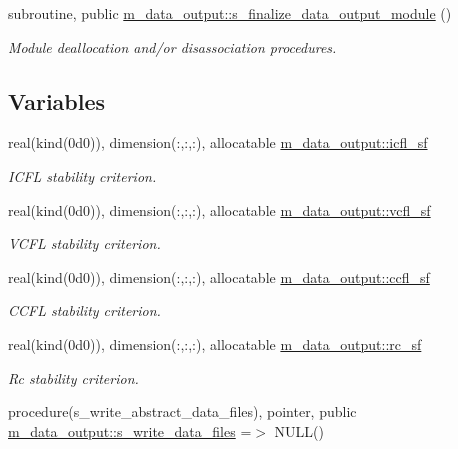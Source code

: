 \begin{DoxyCompactItemize}
subroutine, public \hyperlink{namespacem__data__output_a02f2b04a434c1f0ebf9156147d0f976e}{m\+\_\+data\+\_\+output\+::s\+\_\+finalize\+\_\+data\+\_\+output\+\_\+module} ()
\begin{DoxyCompactList}\small\item\em Module deallocation and/or disassociation procedures. \end{DoxyCompactList}\end{DoxyCompactItemize}
\subsection*{Variables}
\begin{DoxyCompactItemize}
\item 
real(kind(0d0)), dimension(\+:,\+:,\+:), allocatable \hyperlink{namespacem__data__output_a1ca202582d46c282b83b5510e6b6d626}{m\+\_\+data\+\_\+output\+::icfl\+\_\+sf}
\begin{DoxyCompactList}\small\item\em I\+C\+FL stability criterion. \end{DoxyCompactList}\item 
real(kind(0d0)), dimension(\+:,\+:,\+:), allocatable \hyperlink{namespacem__data__output_a629c072bc28e09fe890b966f8adb5f55}{m\+\_\+data\+\_\+output\+::vcfl\+\_\+sf}
\begin{DoxyCompactList}\small\item\em V\+C\+FL stability criterion. \end{DoxyCompactList}\item 
real(kind(0d0)), dimension(\+:,\+:,\+:), allocatable \hyperlink{namespacem__data__output_a660d600ba9338118f6992a0d76bd6a68}{m\+\_\+data\+\_\+output\+::ccfl\+\_\+sf}
\begin{DoxyCompactList}\small\item\em C\+C\+FL stability criterion. \end{DoxyCompactList}\item 
real(kind(0d0)), dimension(\+:,\+:,\+:), allocatable \hyperlink{namespacem__data__output_a700c4b4763b7c2c1479fc05a658fa28d}{m\+\_\+data\+\_\+output\+::rc\+\_\+sf}
\begin{DoxyCompactList}\small\item\em Rc stability criterion. \end{DoxyCompactList}\item 
procedure(s\+\_\+write\+\_\+abstract\+\_\+data\+\_\+files), pointer, public \hyperlink{namespacem__data__output_a1ba4e8126b198fb2147d4d9b60f74e44}{m\+\_\+data\+\_\+output\+::s\+\_\+write\+\_\+data\+\_\+files} =$>$ N\+U\+LL()
\end{DoxyCompactItemize}
